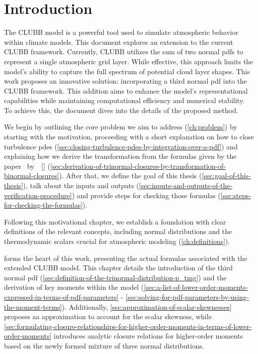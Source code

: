 \chapter{Introduction}\label{ch:introduction}

The \gls{CLUBB} model is a powerful tool used to simulate atmospheric behavior within climate models.
This document explores an extension to the current \gls{CLUBB} framework.
Currently, \gls{CLUBB} utilizes the sum of two normal \glspl{pdf}
to represent a single atmospheric grid layer.
While effective,
this approach limits the model's ability to capture the full spectrum of potential cloud layer shapes.
This work proposes an innovative solution:
incorporating a third normal \gls{pdf} into the \gls{CLUBB} framework.
This addition aims to enhance the model's representational capabilities
while maintaining computational efficiency and numerical stability.
To achieve this, the document dives into the details of the proposed method.

We begin by outlining the core problem we aim to address (\cref{ch:problem})
by starting with the motivation,
proceeding with a short explanation on how to close turbulence \glspl{pde}
(\cref{sec:closing-turbulence-pdes-by-integration-over-a-pdf})
and explaining how we derive the transformation from the formulas
given by the paper~
by~\citeauthor{larson2005using}~[\citeyear{larson2005using}]
(\cref{sec:derivation-of-trinormal-closures-by-transformation-of-binormal-closures}).
After that, we define the goal of this thesis (\cref{sec:goal-of-this-thesis}),
talk about the inputs and outputs (\cref{sec:inputs-and-outputs-of-the-verification-procedure})
and provide steps for checking those formulas (\cref{sec:steps-for-checking-the-formulas}).

Following this motivational chapter,
we establish a foundation with clear definitions of the relevant concepts,
including normal distributions and the thermodynamic scalars
crucial for atmospheric modeling (\cref{ch:definitions}).

 forms the heart of this work,
presenting the actual formulas associated with the extended \gls{CLUBB} model.
This chapter details the introduction of the third normal \gls{pdf} (\cref{sec:definition-of-the-trinormal-distribution-p_tmg})
and the derivation of key moments within the model
(\cref{sec:a-list-of-lower-order-moments-expressed-in-terms-of-pdf-parameters} -
\cref{sec:solving-for-pdf-parameters-by-using-the-moment-terms}).
Additionally,
\cref{sec:approximation-of-scalar-skewnesses} proposes aa approximation
to account for the scalar skewness,
while \cref{sec:formulating-closure-relationships-for-higher-order-moments-in-terms-of-lower-order-moments}
introduces analytic closure relations
for higher-order moments based on the newly formed mixture of three normal distributions.

